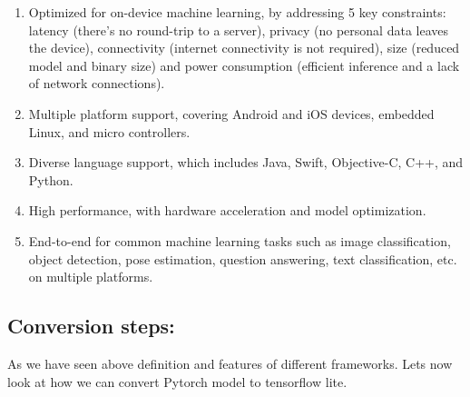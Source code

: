 \begin{enumerate}
  \item Optimized for on-device machine learning, by addressing 5 key constraints: latency (there's no round-trip to a server), privacy (no personal data leaves the device), connectivity (internet connectivity is not required), size (reduced model and binary size) and power consumption (efficient inference and a lack of network connections).
  \item Multiple platform support, covering Android and iOS devices, embedded Linux, and micro controllers.
  \item Diverse language support, which includes Java, Swift, Objective-C, C++, and Python.
  \item High performance, with hardware acceleration and model optimization.
  \item End-to-end for common machine learning tasks such as image classification, object detection, pose estimation, question answering, text classification, etc. on multiple platforms.
\end{enumerate}

\subsection{Conversion steps:}

As we have seen above definition and features of different frameworks. Lets now look at how we can convert Pytorch model to tensorflow lite. 

